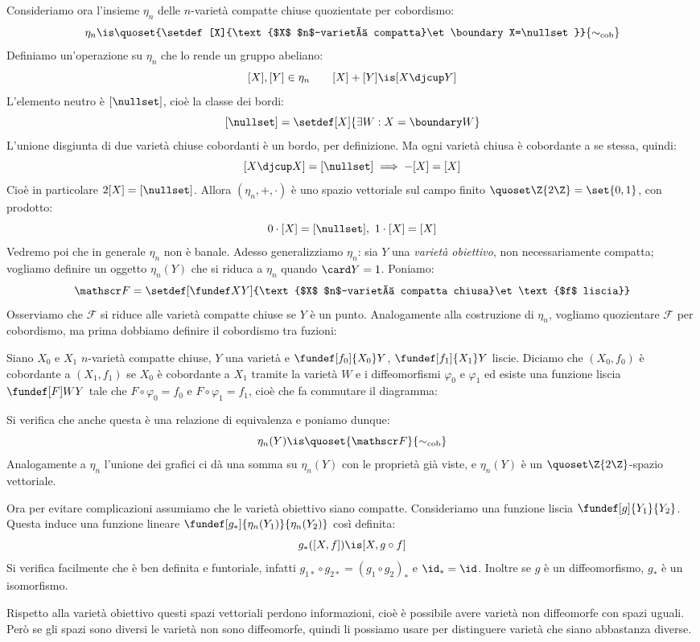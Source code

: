 Consideriamo ora l'insieme $\eta_n$ delle $n$-varietà compatte chiuse quozientate per cobordismo:
\[\eta_n\is\quoset{\setdef[X]{\text{$X$ $n$-varietà compatta}\et\boundary X=\nullset}}{\sim_\text{cob}}\]
Definiamo un'operazione su $\eta_n$ che lo rende un gruppo abeliano:
\[[X],[Y]\in\eta_n\qquad[X]+[Y]\is[X\djcup Y]\]
L'elemento neutro è $[\nullset]$, cioè la classe dei bordi:
\[[\nullset]=\setdef[X]{\exists W:X=\boundary W}\]
L'unione disgiunta di due varietà chiuse cobordanti è un bordo, per definizione. Ma ogni varietà chiusa è cobordante a se stessa, quindi:
\[[X\djcup X]=[\nullset]\implies-[X]=[X]\]
Cioè in particolare $2[X]=[\nullset]$. Allora $(\eta_n,+,\cdot)$ è uno spazio vettoriale sul campo finito $\quoset\Z{2\Z}=\set{0,1}$, con prodotto:
\[0\cdot[X]=[\nullset],\ 1\cdot[X]=[X]\]
Vedremo poi che in generale $\eta_n$ non è banale. Adesso generalizziamo $\eta_n$: sia $Y$ una \emph{varietà obiettivo}, non necessariamente compatta; vogliamo definire un oggetto $\eta_n(Y)$ che si riduca a $\eta_n$ quando $\card Y=1$. Poniamo:
\[\mathscr F=\setdef[\fundef XY]{\text{$X$ $n$-varietà compatta chiusa}\et\text{$f$ liscia}}\]
Osserviamo che $\mathscr F$ si riduce alle varietà compatte chiuse se $Y$ è un punto. Analogamente alla costruzione di $\eta_n$, vogliamo quozientare $\mathscr F$ per cobordismo, ma prima dobbiamo definire il cobordismo tra fuzioni:

\begin{defn}
	Siano $X_0$ e $X_1$ $n$-varietà compatte chiuse, $Y$ una varietà e $\fundef[f_0]{X_0}Y$, $\fundef[f_1]{X_1}Y$ liscie. Diciamo che $(X_0,f_0)$ è cobordante a $(X_1,f_1)$ se $X_0$ è cobordante a $X_1$ tramite la varietà $W$ e i diffeomorfismi $\varphi_0$ e $\varphi_1$ ed esiste una funzione liscia $\fundef[F]WY$ tale che $F\circ\varphi_0=f_0$ e $F\circ\varphi_1=f_1$, cioè che fa commutare il diagramma:
\end{defn}

Si verifica che anche questa è una relazione di equivalenza e poniamo dunque:
\[\eta_n(Y)\is\quoset{\mathscr F}{\sim_\text{cob}}\]
Analogamente a $\eta_n$ l'unione dei grafici ci dà una somma su $\eta_n(Y)$ con le proprietà già viste, e $\eta_n(Y)$ è un $\quoset\Z{2\Z}$-spazio vettoriale.

Ora per evitare complicazioni assumiamo che le varietà obiettivo siano compatte. Consideriamo una funzione liscia $\fundef[g]{Y_1}{Y_2}$. Questa induce una funzione lineare $\fundef[g_*]{\eta_n(Y_1)}{\eta_n(Y_2)}$ così definita:
\[g_*([X,f])\is[X,g\circ f]\]
Si verifica facilmente che è ben definita e funtoriale, infatti $g_{1*}\circ g_{2*}=(g_1\circ g_2)_*$ e $\id_*=\id$. Inoltre se $g$ è un diffeomorfismo, $g_*$ è un isomorfismo.

Rispetto alla varietà obiettivo questi spazi vettoriali perdono informazioni, cioè è possibile avere varietà non diffeomorfe con spazi uguali. Però se gli spazi sono diversi le varietà non sono diffeomorfe, quindi li possiamo usare per distinguere varietà che siano abbastanza diverse.
